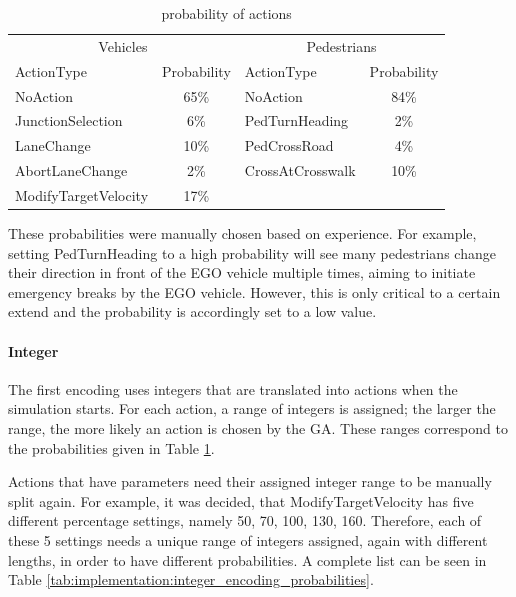 \begin{table}[ht]
	\centering
	\begin{tabular}{lc|lc}
		\hline
		\multicolumn{2}{c|}{Vehicles} & \multicolumn{2}{c}{Pedestrians} \\
		ActionType & Probability & ActionType & Probability \\
		\hline
		NoAction & 65\% & NoAction & 84\% \\
		JunctionSelection & 6\% & PedTurnHeading & 2\% \\
		LaneChange & 10\% & PedCrossRoad & 4\% \\
		AbortLaneChange & 2\% & CrossAtCrosswalk & 10\% \\
		ModifyTargetVelocity & 17\% & & \\
		\hline
	\end{tabular}
	\caption{probability of actions}
	\label{tab:implementation:action_probabilities}
\end{table}

These probabilities were manually chosen based on experience. For example, setting PedTurnHeading to a high probability will see many pedestrians change their direction in front of the EGO vehicle multiple times, aiming to initiate emergency breaks by the EGO vehicle. However, this is only critical to a certain extend and the probability is accordingly set to a low value.

\paragraph{Integer}
The first encoding uses integers that are translated into actions when the simulation starts. For each action, a range of integers is assigned; the larger the range, the more likely an action is chosen by the GA. These ranges correspond to the probabilities given in Table \ref{tab:implementation:action_probabilities}.

Actions that have parameters need their assigned integer range to be manually split again. For example, it was decided, that ModifyTargetVelocity has five different percentage settings, namely 50, 70, 100, 130, 160. Therefore, each of these 5 settings needs a unique range of integers assigned, again with different lengths, in order to have different probabilities. A complete list can be seen in Table \ref{tab:implementation:integer_encoding_probabilities}.

